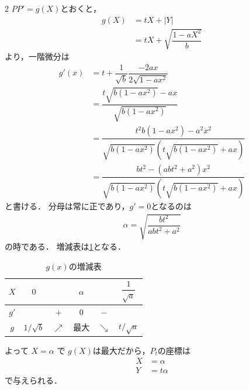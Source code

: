 \documentclass[../../main.tex]{subfiles}
\begin{document}
\begin{multicols}{2}
  $PP' = g(X)$とおくと，
  \begin{align}
    g(X)
    & = tX + |Y|                       \\
    & = tX + \sqrt{\dfrac{1 - aX^2}{b}}
  \end{align}
  より，一階微分は
  \begin{align}
    g'(x)
    & = t + \dfrac{1}{\sqrt{b}} \dfrac{-2ax}{2\sqrt{1-ax^2}}                              \\
    & = \dfrac{t\sqrt{b(1-ax^2)}-ax}{\sqrt{b(1-ax^2)}}                                   \\
    & = \dfrac{t^2b(1-ax^2)-a^2x^2}{\sqrt{b(1-ax^2)}\left(t\sqrt{b(1-ax^2)}+ax\right)}   \\
    & = \dfrac{bt^2 - (abt^2+a^2)x^2}{\sqrt{b(1-ax^2)}\left(t\sqrt{b(1-ax^2)}+ax\right)}
  \end{align}
  と書ける．
  分母は常に正であり，$g'=0$となるのは
  \begin{align}
    \alpha = \sqrt{\dfrac{bt^2}{abt^2 + a^2}}
  \end{align}
  の時である．
  増減表は\cref{2006-1:table:1}となる．
  \begin{table}[H]
    \centering
    \caption{$g(x)$の増減表}
    \label{2006-1:table:1}
    \begin{tabular}{|c||c|c|c|c|c|}
      \hline
      $X$  & $0$          &            & $\alpha$ &            & $\dfrac{1}{\sqrt{a}}$ \\
      \hline
      $g'$ &              & $+$        & $0$      & $-$        &                      \\
      \hline
      $g$  & $1/\sqrt{b}$ & $\nearrow$ & 最大       & $\searrow$ & $t/\sqrt{a}$         \\
      \hline
    \end{tabular}
  \end{table}

  よって $X = \alpha$ で $g(X)$は最大だから，$P_t$の座標は
  \begin{align}
    X & = \alpha  \\
    Y & = t\alpha
  \end{align}
  で与えられる．


\end{multicols}
\end{document}
